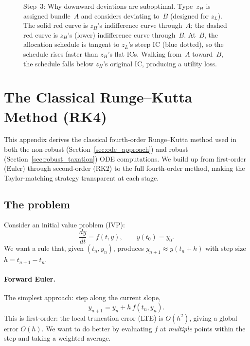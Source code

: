 \documentclass[12pt,a4paper]{article}
\theoremstyle{definition}
\theoremstyle{plain}
\theoremstyle{remark}
\begin{document}
\begin{figure}[ht]
\caption{Step~3: Why downward deviations are suboptimal. Type~$z_H$ is assigned bundle~$A$ and considers deviating to~$B$ (designed for $z_L$). The solid red curve is $z_H$'s indifference curve through~$A$; the dashed red curve is $z_H$'s (lower) indifference curve through~$B$. At~$B$, the allocation schedule is tangent to $z_L$'s steep IC (blue dotted), so the schedule rises faster than $z_H$'s flat ICs. Walking from~$A$ toward~$B$, the schedule falls below $z_H$'s original IC, producing a utility loss.}
\label{fig:deviation}
\end{figure}


\section{The Classical Runge--Kutta Method (RK4)}
\label{app:rk4}

This appendix derives the classical fourth-order Runge--Kutta method used in both the non-robust (Section~\ref{sec:ode_approach}) and robust (Section~\ref{sec:robust_taxation}) ODE computations. We build up from first-order (Euler) through second-order (RK2) to the full fourth-order method, making the Taylor-matching strategy transparent at each stage.

\subsection{The problem}

Consider an initial value problem (IVP):
\begin{equation}
\label{eq:rk4_ivp}
  \frac{dy}{dt} = f(t, y), \qquad y(t_0) = y_0.
\end{equation}
We want a rule that, given $(t_n, y_n)$, produces $y_{n+1} \approx y(t_n + h)$ with step size $h = t_{n+1} - t_n$.

\paragraph{Forward Euler.} The simplest approach: step along the current slope,
\[
  y_{n+1} = y_n + h\, f(t_n, y_n).
\]
This is first-order: the local truncation error (LTE) is $O(h^2)$, giving a global error $O(h)$. We want to do better by evaluating $f$ at \emph{multiple} points within the step and taking a weighted average.
\end{document}
